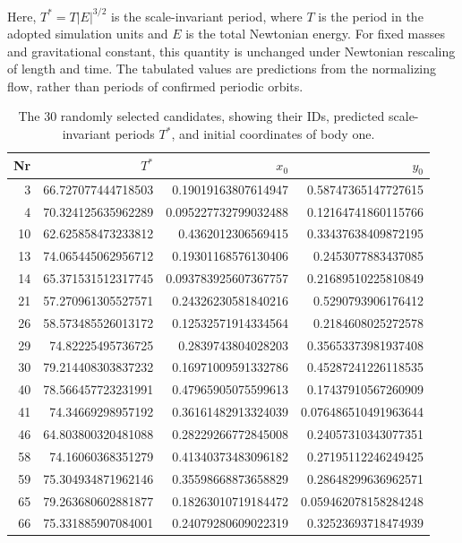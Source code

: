 Here, $T^{*}=T|E|^{3/2}$ is the scale-invariant period, where $T$ is the period in the adopted simulation units and $E$ is the total Newtonian energy. For fixed masses and gravitational constant, this quantity is unchanged under Newtonian rescaling of length and time. The tabulated values are predictions from the normalizing flow, rather than periods of confirmed periodic orbits.

\begin{table}[p]
\centering
\small
\setlength{\tabcolsep}{5pt}
\caption{The 30 randomly selected candidates, showing their IDs, predicted scale-invariant periods $T^{*}$, and initial coordinates of body one.}
\label{tab:norm-flow-original-candidates}
\begin{tabular}{rrrr}
\toprule
Nr & $T^{*}$ & $x_0$ & $y_0$ \\
\midrule
3 & 66.727077444718503 & 0.19019163807614947 & 0.58747365147727615 \\
4 & 70.324125635962289 & 0.095227732799032488 & 0.12164741860115766 \\
10 & 62.625858473233812 & 0.4362012306569415 & 0.33437638409872195 \\
13 & 74.065445062956712 & 0.19301168576130406 & 0.2453077883437085 \\
14 & 65.371531512317745 & 0.093783925607367757 & 0.21689510225810849 \\
21 & 57.270961305527571 & 0.24326230581840216 & 0.5290793906176412 \\
26 & 58.573485526013172 & 0.12532571914334564 & 0.2184608025272578 \\
29 & 74.82225495736725 & 0.2839743804028203 & 0.35653373981937408 \\
30 & 79.214408303837232 & 0.16971009591332786 & 0.45287241226118535 \\
40 & 78.566457723231991 & 0.47965905075599613 & 0.17437910567260909 \\
41 & 74.34669298957192 & 0.36161482913324039 & 0.076486510491963644 \\
46 & 64.803800320481088 & 0.28229266772845008 & 0.24057310343077351 \\
58 & 74.16060368351279 & 0.41340373483096182 & 0.27195112246249425 \\
59 & 75.304934871962146 & 0.35598668873658829 & 0.28648299636962571 \\
65 & 79.263680602881877 & 0.18263010719184472 & 0.059462078158284248 \\
66 & 75.331885907084001 & 0.24079280609022319 & 0.32523693718474939 \\

\end{tabular}
\end{table}
